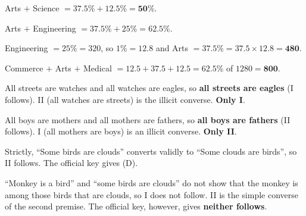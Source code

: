 Arts $+$ Science $=37.5\%+12.5\%=\mathbf{50\%}$.

Arts $+$ Engineering $=37.5\%+25\%=\mathbf{62.5\%}$.

Engineering $=25\%=320$, so $1\%=12.8$ and Arts $=37.5\%=37.5\times12.8=\mathbf{480}$.

Commerce $+$ Arts $+$ Medical $=12.5+37.5+12.5=62.5\%$ of $1280=\mathbf{800}$.

\begin{center}\end{center}
All streets are watches and all watches are eagles, so \textbf{all streets are eagles} (I follows). II (all watches are streets) is the illicit converse. \textbf{Only I}.

All boys are mothers and all mothers are fathers, so \textbf{all boys are fathers} (II follows). I (all mothers are boys) is an illicit converse. \textbf{Only II}.

Strictly, ``Some birds are clouds'' converts validly to ``Some clouds are birds'', so II follows. The official key gives (D).

``Monkey is a bird'' and ``some birds are clouds'' do not show that the monkey is among those birds that are clouds, so I does not follow. II is the simple converse of the second premise. The official key, however, gives \textbf{neither follows}.

